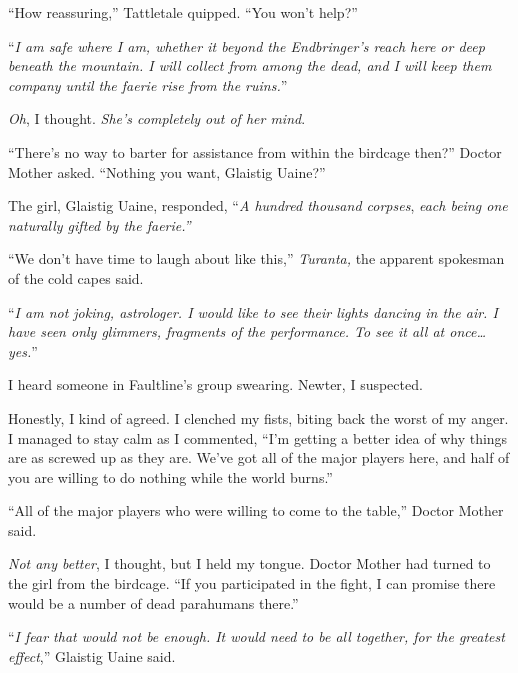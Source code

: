 ``How reassuring,'' Tattletale quipped.  ``You won't help?''



``\emph{I am safe where I am, whether it beyond the Endbringer's reach here or deep beneath the mountain.  I will collect from among the dead, and I will keep them company until the faerie rise from the ruins.}''



\emph{Oh}, I thought.  \emph{She's completely out of her mind}.



``There's no way to barter for assistance from within the birdcage then?'' Doctor Mother asked.  ``Nothing you want, Glaistig Uaine?''



The girl, Glaistig Uaine, responded, ``\emph{A hundred thousand corpses}, \emph{each being one naturally gifted by the faerie.''}



``We don't have time to laugh about like this,'' \emph{Turanta, }the apparent spokesman of the cold capes said.



``\emph{I am not joking, astrologer.  I would like to see their lights dancing in the air.  I have seen only glimmers, fragments of the performance.  To see it all at once\ldots yes.}''



I heard someone in Faultline's group swearing.  Newter, I suspected.



Honestly, I kind of agreed.  I clenched my fists, biting back the worst of my anger.  I managed to stay calm as I commented, ``I'm getting a better idea of why things are as screwed up as they are.  We've got all of the major players here, and half of you are willing to do nothing while the world burns.''



``All of the major players who were willing to come to the table,'' Doctor Mother said.



\emph{Not any better}, I thought, but I held my tongue.  Doctor Mother had turned to the girl from the birdcage.  ``If you participated in the fight, I can promise there would be a number of dead parahumans there.''



``\emph{I fear that would not be enough.  It would need to be all together, for the greatest effect},'' Glaistig Uaine said.



